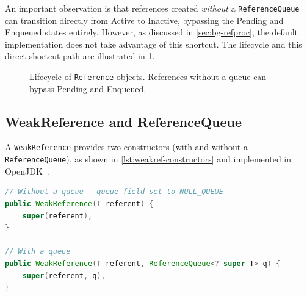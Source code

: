 An important observation is that references created \emph{without} a \texttt{ReferenceQueue} can transition directly from Active to Inactive, bypassing the Pending and Enqueued states entirely. However, as discussed in \cref{sec:bg-refproc}, the default implementation does not take advantage of this shortcut. The lifecycle and this direct shortcut path are illustrated in \cref{fig:reference-lifecycle}.

\begin{figure}[t]
\centering
{}
\caption[Reference lifecycle states]{Lifecycle of \texttt{Reference} objects. References without a queue can bypass Pending and Enqueued.}
\label{fig:reference-lifecycle}
\end{figure}

\subsection{WeakReference and ReferenceQueue}
\label{subsec:bg-reftypes-queue}

A \texttt{WeakReference} provides two constructors (with and without a \texttt{ReferenceQueue}), as shown in \cref{lst:weakref-constructors} and implemented in OpenJDK~\cite{openjdk-weakreference-java}.

\begin{listing}[htbp]
\begin{lstlisting}[language=Java]
// Without a queue - queue field set to NULL_QUEUE
public WeakReference(T referent) {
    super(referent),
}

// With a queue
public WeakReference(T referent, ReferenceQueue<? super T> q) {
    super(referent, q),
}
\end{lstlisting}
\caption[WeakReference constructors]{WeakReference constructors}
\label{lst:weakref-constructors}
\end{listing}


